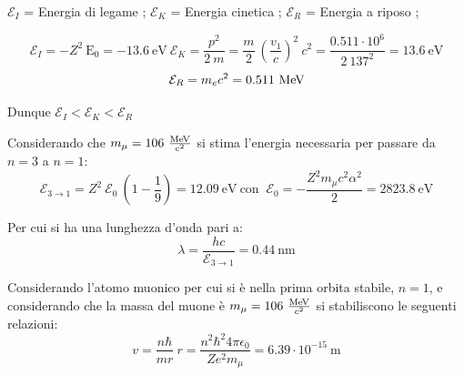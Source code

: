 \documentclass[12pt,twoside,a4]{article}
\begin{document}
\begin{solution}

$ \mathcal{E}_I $ = Energia di legame ; $ \mathcal{E}_K $ = Energia cinetica ; $ \mathcal{E}_R $ = Energia a riposo ;

\begin{equation*}
\mathcal{E}_I = - Z^2 \ \mathrm{E}_0 = - 13.6 \ \mathrm{eV}    \   \mathcal{E}_K = \frac{p^2}{2 \ m} = \frac{m}{2} \ \left(\frac{v_1}{c}\right)^2 \ c^2 = \frac{0.511 \cdot 10^6}{2 \ 137^2} = 13.6 \ \mathrm{eV}    
\end{equation*}
\begin{equation*}
 \mathcal{E}_R = m_e c^2 = 0.511 \ \mev   
\end{equation*}

\medskip
Dunque $\mathcal{E}_I < \mathcal{E}_K < \mathcal{E}_R$
\end{solution}




\begin{solution}
	Considerando che $m_\mu = 106 \ \frac{\mev}{\mathrm{c}^2}$ si stima l'energia necessaria per passare da $n = 3$ a $n = 1$: \begin{equation*}
\mathcal{E}_{3\rightarrow 1} = {Z^2 \ \mathcal{E}_0} \ \left(1- \frac{1}{9} \right) = 12.09 \ \mathrm{eV}  \  \text{con }  \  \mathcal{E}_0 = - \frac{Z^2 m_\mu c^2 \alpha^2}{2} = 2823.8 \ \mathrm{eV}   
\end{equation*}
 
Per cui si ha una lunghezza d'onda pari a: 
\begin{equation*}
\lambda = \frac{h c}{\mathcal{E}_{3\rightarrow 1}} = 0.44 \ \mathrm{nm}     
\end{equation*}
\end{solution}

\newpage
\begin{solution}
Considerando l'atomo muonico per cui si è nella prima orbita stabile, $n =1$, e considerando che la massa del muone è $m_\mu = 106 \ \frac{\mathrm{MeV}}{c^2}$ si stabiliscono le seguenti relazioni: \begin{equation*}
 v = \frac{n \hbar}{m r}  \  r = \frac{n^2 \hbar^2 4 \pi \epsilon_0}{Z e^2 m_\mu} = 6.39 \cdot 10^{-15} \ \mathrm{m}  
\end{equation*}
\end{solution}
\end{document}
